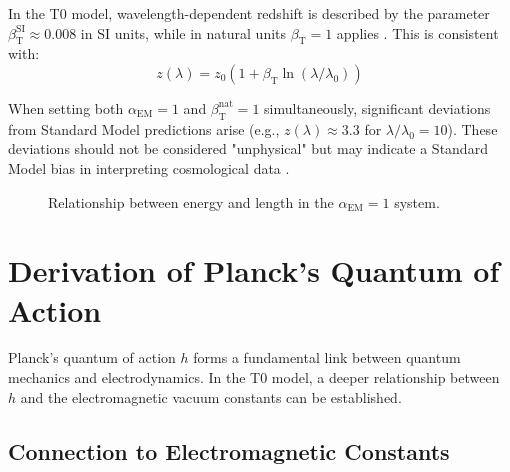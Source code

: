 \documentclass[12pt,a4paper]{article}
\newcommand{\betaT}{\beta_{\text{T}}}
\newcommand{\alphaEM}{\alpha_{\text{EM}}}
\begin{document}
	In the T0 model, wavelength-dependent redshift is described by the parameter \(\betaT^{\text{SI}} \approx 0.008\) in SI units, while in natural units \(\betaT = 1\) applies \cite{pascher_params_2025}. This is consistent with:
	\begin{equation}
		\label{eq:wavelength_redshift}
		z(\lambda) = z_0 (1 + \betaT \ln(\lambda/\lambda_0))
	\end{equation}
	
	When setting both \(\alphaEM = 1\) and \(\betaT^{\text{nat}} = 1\) simultaneously, significant deviations from Standard Model predictions arise (e.g., \(z(\lambda) \approx 3.3\) for \(\lambda/\lambda_0 = 10\)). These deviations should not be considered "unphysical" but may indicate a Standard Model bias in interpreting cosmological data \cite{pascher_alphabeta_2025}.
	
	\begin{figure}[h]
		\centering
		\caption{Relationship between energy and length in the \(\alphaEM = 1\) system.}
		\label{fig:energy_length}
	\end{figure}
	
	\section{Derivation of Planck's Quantum of Action}
	\label{sec:planck_quantum}
	
	Planck's quantum of action \(h\) forms a fundamental link between quantum mechanics and electrodynamics. In the T0 model, a deeper relationship between \(h\) and the electromagnetic vacuum constants can be established.
	
	\subsection{Connection to Electromagnetic Constants}
	\label{subsec:electromagnetic_constants}
	
\end{document}

